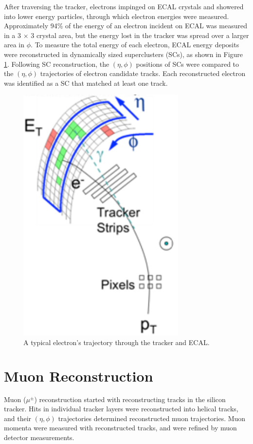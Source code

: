 After traversing the tracker, electrons impinged on ECAL crystals and showered into lower energy particles, 
through which electron energies were measured.  Approximately 94\% of the energy of an electron 
incident on ECAL was measured in a 3 $\times$ 3 crystal area, but the energy lost in the tracker was spread 
over a larger area in $\phi$.  To measure the total energy of each electron, ECAL energy deposits were 
reconstructed in dynamically sized superclusters (SCs), as shown in Figure \ref{fig:eleTrackAndSC}.  Following 
SC reconstruction, the $(\eta, \phi)$ positions of SCs were compared to the $(\eta, \phi)$ trajectories of 
electron candidate tracks.  Each reconstructed electron was identified as a SC that matched at least one track.

\begin{figure}[h]
	\centering
	\includegraphics[width=0.75\textwidth]{figures/electronTrackAndSupercluster.png}
	\caption{A typical electron's trajectory through the tracker and ECAL.}
	\label{fig:eleTrackAndSC}
\end{figure}


\section{Muon Reconstruction}
\label{sec:muReco}
Muon ($\mu^{\pm}$) reconstruction started with reconstructing tracks in the silicon tracker.  
Hits in individual tracker layers were reconstructed into helical tracks, and their $(\eta, \phi)$ 
trajectories determined reconstructed muon trajectories.  Muon momenta were measured with 
reconstructed tracks, and were refined by muon detector measurements.

